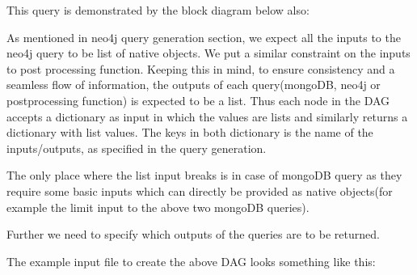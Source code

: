 \documentclass[letterpaper,10pt,english]{sphinxmanual}
\begin{document}
This query is demonstrated by the block diagram below also:

\noindent{}

As mentioned in neo4j query generation section, we expect all the inputs to the neo4j query to be  list of native objects. We put a similar constraint on the inputs to post processing function. Keeping this in mind, to ensure consistency and a seamless flow of information, the outputs of each query(mongoDB, neo4j or postprocessing function) is expected to be a list. Thus each node in the DAG accepts a dictionary as input in which the values are lists and similarly returns a dictionary with list values. The keys in both dictionary is the name of the inputs/outputs, as specified in the query generation.

The only place where the list input breaks is in case of mongoDB query as they require some basic inputs which can directly be provided as native objects(for example the limit input to the above two mongoDB queries).

Further we need to specify which outputs of the queries are to be returned.

The example input file to create the above DAG looks something like this:

\begin{sphinxVerbatim}[commandchars=\\\{\}]
 
 
 
 
 
\end{sphinxVerbatim}
\end{document}
